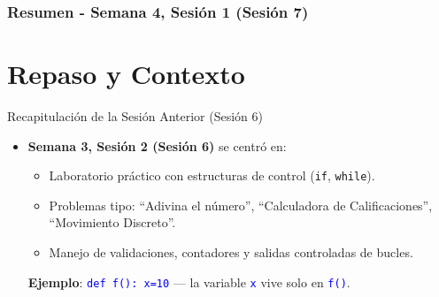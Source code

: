 \documentclass[10pt]{beamer}
\begin{document}
\myfront{}

\begin{frame}
  \titlepage
\end{frame}

\begin{frame}
  \frametitle{Resumen - Semana 4, Sesión 1 (Sesión 7)}
  \tableofcontents
\end{frame}


\section{Repaso y Contexto}

\begin{frame}{Recapitulación de la Sesión Anterior (Sesión 6)}
  \begin{itemize}
    \item \textbf{Semana 3, Sesión 2 (Sesión 6)} se centró en:
      \begin{itemize}
        \item Laboratorio práctico con estructuras de control (\texttt{if}, \texttt{while}).
        \item Problemas tipo: “Adivina el número”, “Calculadora de Calificaciones”, “Movimiento Discreto”.
        \item Manejo de validaciones, contadores y salidas controladas de bucles.
      \end{itemize}
      \textbf{Ejemplo}: {\texttt{\textcolor{blue}{def f(): x=10}}} — la variable {\texttt{\textcolor{blue}{x}}} vive solo en {\texttt{\textcolor{blue}{f()}}}.
  \end{itemize}
\end{frame}
\end{document}
